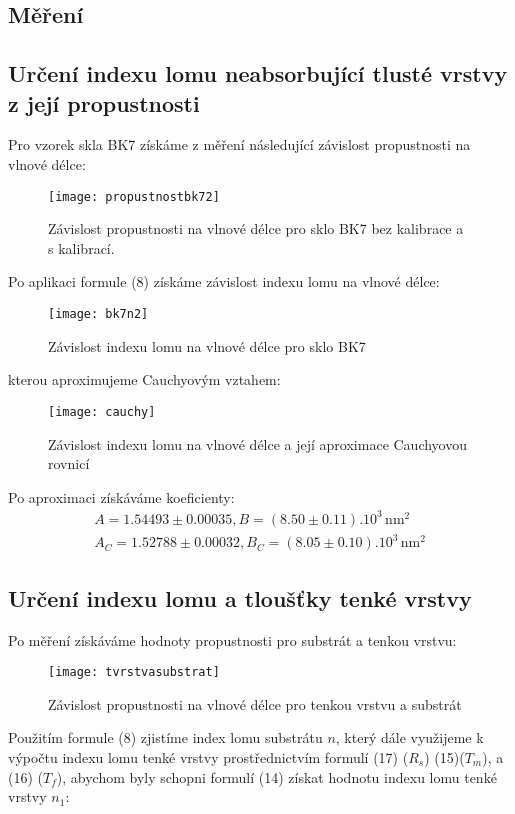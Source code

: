 \documentclass[czech,11pt,a4paper]{article}
\begin{document}
\begin{multicols}{2}
	\section{Měření}\subsection{Určení indexu lomu neabsorbující tlusté vrstvy z její propustnosti}	Pro vzorek skla BK7 získáme z měření následující závislost propustnosti na vlnové délce:	\begin{figure}[H]
	\begin{center}		
		\texttt{[image: propustnostbk72]} 		
		\caption{Závislost propustnosti na vlnové délce pro sklo BK7 bez kalibrace a s kalibrací.}	\end{center}\end{figure} 
	Po aplikaci formule (8) získáme závislost indexu lomu na vlnové délce:
	\begin{figure}[H]
	\begin{center}		
		\texttt{[image: bk7n2]} 
		\caption{Závislost indexu lomu na vlnové délce pro sklo BK7}
	\end{center}
	\end{figure}
	kterou aproximujeme Cauchyovým vztahem:
	\begin{figure}[H]
		\begin{center}
			
			\texttt{[image: cauchy]} 
			\caption{Závislost indexu lomu na vlnové délce a její aproximace Cauchyovou rovnicí}
		\end{center}
	\end{figure}
	Po aproximaci získáváme koeficienty:
	{\small \begin{gather*}
		A=1.54493\pm 0.00035, B = (8.50 \pm 0.11).10^3\,\mathrm{nm^2}\\ 
		A_C = 1.52788\pm 0.00032, B_C = (8.05\pm 0.10).10^3\,\mathrm{nm^2}
	\end{gather*}}
	
	\subsection{Určení indexu lomu a tloušťky tenké vrstvy}
	Po měření získáváme hodnoty propustnosti pro substrát a tenkou vrstvu:
	\begin{figure}[H]
		\begin{center}
			\texttt{[image: tvrstvasubstrat]} 
			\caption{Závislost propustnosti na vlnové délce pro tenkou vrstvu a substrát}	\end{center}\end{figure}
	Použitím formule (8) zjistíme index lomu substrátu $n$, který dále využijeme k výpočtu indexu lomu tenké vrstvy prostřednictvím formulí (17) ($R_s$) (15)($T_m$), a (16) ($T_f$), abychom byly schopni formulí (14) získat hodnotu indexu lomu tenké vrstvy $n_1$:
	

\end{multicols}
\end{document}
